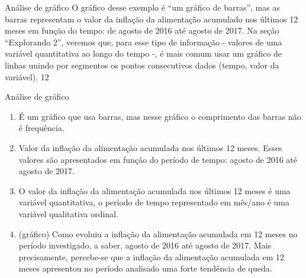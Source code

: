 {\begin{sugestions}{Análise de gráfico}
{
O gráfico desse exemplo é “um gráfico de barras”, mas as barras representam o valor da inflação da alimentação acumulado nos últimos 12 meses em função do tempo: de agosto de 2016 até agosto de 2017. Na seção “Explorando 2”, veremos que, para esse tipo de informação - valores de uma variável quantitativa ao longo do tempo -, é mais comum usar um gráfico de linhas unindo por segmentos os pontos consecutivos dados (tempo, valor da variável).
}{1}{2}
\end{sugestions}
\begin{answer}{Análise de gráfico}
{
\begin{enumerate}
\item É um gráfico que usa barras, mas nesse gráfico o comprimento das barras não é frequência.

\item Valor da inflação da alimentação acumulada nos últimos 12 meses. Esses valores são apresentados em função do período de tempo: agosto de 2016 até agosto de 2017.

\item O valor da inflação da alimentação acumulada nos últimos 12 meses é uma variável quantitativa, o período de tempo representado em mês/ano é uma variável qualitativa ordinal.

\item (gráfico) Como evoluiu a inflação da alimentação acumulada em 12 meses no período investigado, a saber, agosto de 2016 até agosto de 2017. Mais precisamente, percebe-se que a inflação da alimentação acumulada em 12 meses apresentou no período analisado uma forte tendência de queda.

\begin{figure}[H]
\centering


\end{figure}
\end{enumerate}}
\end{answer}}
